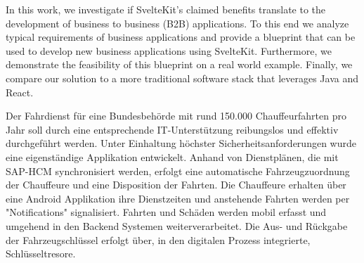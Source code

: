 \documentclass[
a4paper, 
DIV=15, 
headsepline, 
numbers=noenddot,
bibliography=totoc,
BCOR=15mm,
leqno,
]{scrarticle}
\begin{document}
In this work, we investigate if SvelteKit's claimed benefits translate to the development of business to business (B2B) applications. To this end we analyze typical requirements of business applications and provide a blueprint that can be used to develop new business applications using SvelteKit. Furthermore, we demonstrate the feasibility of this blueprint on a real world example. Finally, we compare our solution to a more traditional software stack that leverages Java and React.




Der Fahrdienst für eine Bundesbehörde mit rund 150.000 Chauffeurfahrten pro Jahr soll durch eine entsprechende IT-Unterstützung reibungslos und effektiv durchgeführt werden.
Unter Einhaltung höchster Sicherheitsanforderungen wurde eine eigenständige Applikation entwickelt. Anhand von Dienstplänen, die mit SAP-HCM synchronisiert werden, erfolgt eine automatische Fahrzeugzuordnung der Chauffeure und eine Disposition der Fahrten. Die Chauffeure erhalten über eine Android Applikation ihre Dienstzeiten und anstehende Fahrten werden per "Notifications" signalisiert. Fahrten und Schäden werden mobil erfasst und umgehend in den Backend Systemen weiterverarbeitet. Die Aus- und Rückgabe der Fahrzeugschlüssel erfolgt über, in den digitalen Prozess integrierte, Schlüsseltresore.
\end{document}
